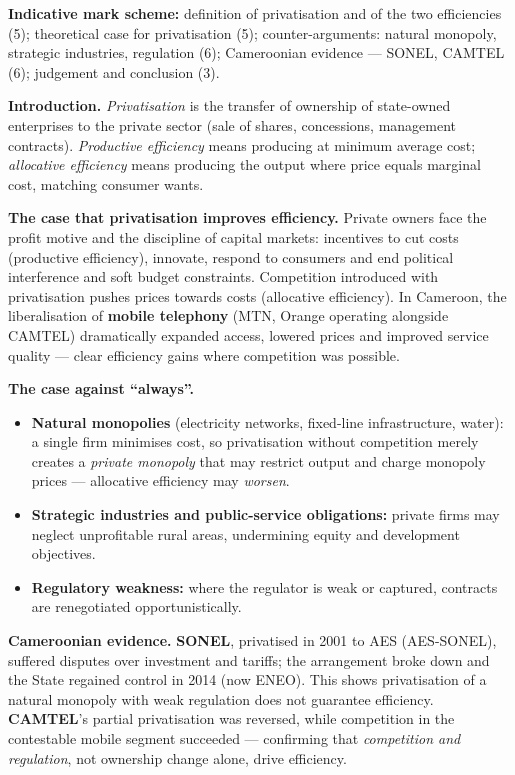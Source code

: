 \documentclass[11pt]{article}
\begin{document}
\begin{corrige}
\textbf{Indicative mark scheme:} definition of privatisation and of the two efficiencies (5); theoretical case for privatisation (5); counter-arguments: natural monopoly, strategic industries, regulation (6); Cameroonian evidence — SONEL, CAMTEL (6); judgement and conclusion (3).

\textbf{Introduction.} \emph{Privatisation} is the transfer of ownership of state-owned enterprises to the private sector (sale of shares, concessions, management contracts). \emph{Productive efficiency} means producing at minimum average cost; \emph{allocative efficiency} means producing the output where price equals marginal cost, matching consumer wants.

\textbf{The case that privatisation improves efficiency.} Private owners face the profit motive and the discipline of capital markets: incentives to cut costs (productive efficiency), innovate, respond to consumers and end political interference and soft budget constraints. Competition introduced with privatisation pushes prices towards costs (allocative efficiency). In Cameroon, the liberalisation of \textbf{mobile telephony} (MTN, Orange operating alongside CAMTEL) dramatically expanded access, lowered prices and improved service quality — clear efficiency gains where competition was possible.

\textbf{The case against ``always''.}
\begin{itemize}
\item \textbf{Natural monopolies} (electricity networks, fixed-line infrastructure, water): a single firm minimises cost, so privatisation without competition merely creates a \emph{private monopoly} that may restrict output and charge monopoly prices — allocative efficiency may \emph{worsen}.
\item \textbf{Strategic industries and public-service obligations:} private firms may neglect unprofitable rural areas, undermining equity and development objectives.
\item \textbf{Regulatory weakness:} where the regulator is weak or captured, contracts are renegotiated opportunistically.
\end{itemize}

\textbf{Cameroonian evidence.} \textbf{SONEL}, privatised in 2001 to AES (AES-SONEL), suffered disputes over investment and tariffs; the arrangement broke down and the State regained control in 2014 (now ENEO). This shows privatisation of a natural monopoly with weak regulation does not guarantee efficiency. \textbf{CAMTEL}'s partial privatisation was reversed, while competition in the contestable mobile segment succeeded — confirming that \emph{competition and regulation}, not ownership change alone, drive efficiency.


\end{corrige}
\end{document}
